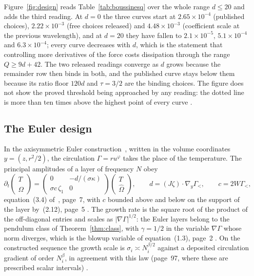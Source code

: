 \documentclass[11pt]{article}
\theoremstyle{remark}
\newcommand{\ev}[1]{\hspace{0.2em}{\small\textsf{[#1]}}}
\begin{document}
Figure~\ref{fig:design} reads Table~\ref{tab:boussinesq} over the whole range $d\le20$ and adds the third
reading. At $d=0$ the three curves start at $2.65\times10^{-4}$ (published choices), $2.22\times10^{-3}$
(free choices released) and $4.48\times10^{-3}$ (coefficient scale at the previous wavelength), and at $d=20$
they have fallen to $2.1\times10^{-5}$, $5.1\times10^{-4}$ and $6.3\times10^{-4}$; every curve decreases
with $d$, which is the statement that controlling more derivatives of the force costs dissipation through the
range $Q\ge9d+42$. The two released readings converge as $d$ grows because the remainder row then binds in both,
and the published curve stays below them because its ratio floor $120d$ and $\tau=3/2$ are the binding
choices. The figure does not show the proved threshold being approached by any reading: the dotted line is
more than ten times above the highest point of every curve \ev{MV}.

\subsection{The Euler design}\label{sec:euler}

In the axisymmetric Euler construction~\cite{ab-euler}, written in the volume coordinates
$y=(z,r^{2}/2)$, the circulation $\Gamma=ru^{\varphi}$ takes the place of the temperature. The
principal amplitudes of a layer of frequency $N$ obey
\begin{equation}\label{eq:euler-amp}
\partial_{t}\begin{pmatrix}T\\ \widehat\Omega\end{pmatrix}
=\begin{pmatrix}0&-d/(\sigma\kappa)\\ \sigma c\,\zeta_{1}&0\end{pmatrix}
\begin{pmatrix}T\\ \widehat\Omega\end{pmatrix},
\qquad d=(J\zeta)\cdot\nabla_{y}\Gamma_{<},\qquad c=2W\Gamma_{<},
\end{equation}
equation~(3.4) of~\cite{ab-euler}, page~7, with $c$ bounded above and below on the support of the layer
by~(2.12), page~5 \ev{V}. The growth rate is the square root of the product of the off-diagonal
entries and scales as $|\nabla\Gamma|^{1/2}$: the Euler layers belong to the pendulum class of
Theorem~\ref{thm:class}, with $\gamma=1/2$ in the variable $\nabla\Gamma$ whose norm diverges, which
is the blowup variable of equation~(1.3), page~2 \ev{D}. On the constructed sequence the growth scale is
$\sigma_{i}\asymp N_{i}^{\beta/2}$ against a deposited circulation gradient of order $N_{i}^{\beta}$,
in agreement with this law (page~97, where these are prescribed scalar intervals) \ev{V}.
\end{document}
